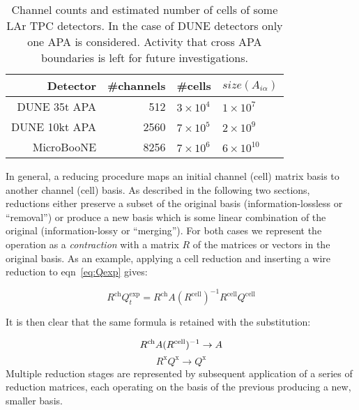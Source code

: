 \documentclass[letter]{article}
\def\mAchc{A_{i\alpha}}
\begin{document}
\begin{table}[htbp]
  \centering
  \begin{tabular}[h]{|r|r|l|l|}
    \hline
    Detector & \#channels & \#cells & $size(\mAchc)$ \\
    \hline
    \hline
    DUNE 35t APA & 512 & $3\times 10^4$ & $1\times 10^7$\\
    DUNE 10kt APA & 2560 & $7\times 10^5$ & $2\times 10^9$ \\
    MicroBooNE & 8256 & $7\times 10^6$ & $6\times 10^{10}$\\
    \hline
  \end{tabular}
  \caption{Channel counts and estimated number of cells of some LAr
    TPC detectors.
    In the case of DUNE detectors only one APA is considered.
    Activity that cross APA boundaries is left for future investigations.}
  \label{tab:detectorcounts}
\end{table}

In general, a reducing procedure maps an initial channel (cell) matrix
basis to another channel (cell) basis.
As described in the following two sections, reductions either preserve a subset of the
original basis (information-lossless or ``removal'') or produce a new basis which is some
linear combination of the original (information-lossy or ``merging'').
For both cases we represent the operation as a \textit{contraction} with
a matrix $R$ of the matrices or vectors in the original basis.
As an example, applying a cell reduction and inserting a wire
reduction to eqn~\ref{eq:Qexp} gives:

\begin{equation}
  \label{eq:contraction}
  R^\mathrm{ch} Q^\mathrm{exp}_t = 
R^\mathrm{ch} 
A (R^\mathrm{cell})^{-1} 
R^\mathrm{cell}  
Q^\mathrm{cell}
\end{equation}

It is then clear that the same formula is retained with the
substitution:

\begin{equation}
  \label{eq:subst}
  R^\mathrm{ch} A (R^\mathrm{cell})^{-1} \to A\\
\end{equation}
\begin{equation}
  \label{eq:subst2}
  R^\mathrm{x} Q^\mathrm{x} \to Q^\mathrm{x}
\end{equation}
Multiple reduction stages are represented by subsequent application of
a series of reduction matrices, each operating on the basis of the
previous producing a new, smaller basis.
\end{document}
